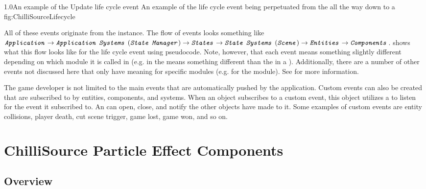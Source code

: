 {1.0}{An example of the Update life cycle event}
{An example of the  life cycle event being perpetuated from the  all the way down to a }
{fig:ChilliSourceLifecycle}

All of these events originate from the  instance. The flow of events looks something like $\class{Application} \rightarrow \class{Application Systems} \ (\class{State Manager}) \rightarrow \class{States} \rightarrow \class{State Systems} \ (\class{Scene}) \rightarrow \class{Entities} \rightarrow \class{Components}$.  shows what this flow looks like for the  life cycle event using pseudocode. Note, however, that each event means something slightly different depending on which module it is called in (e.g.  in the  means something different than the  in a ). Additionally, there are a number of other events not discussed here that only have meaning for specific modules (e.g.  for the  module). See \cite{ChilliSource2014LifeCycleEvents} for more information.

The game developer is not limited to the main events that are automatically pushed by the application. Custom events can also be created that are subscribed to by entities, components, and systems. When an object subscribes to a custom event, this object utilizes a  to listen for the event it subscribed to. An  can open, close, and notify the  other objects have made to it. Some examples of custom events are entity collisions, player death, cut scene trigger, game lost, game won, and so on. 


\section{ChilliSource Particle Effect Components}\label{sec:cs_pec}

\subsection{Overview}\label{ssec:cs_pec_overview}

